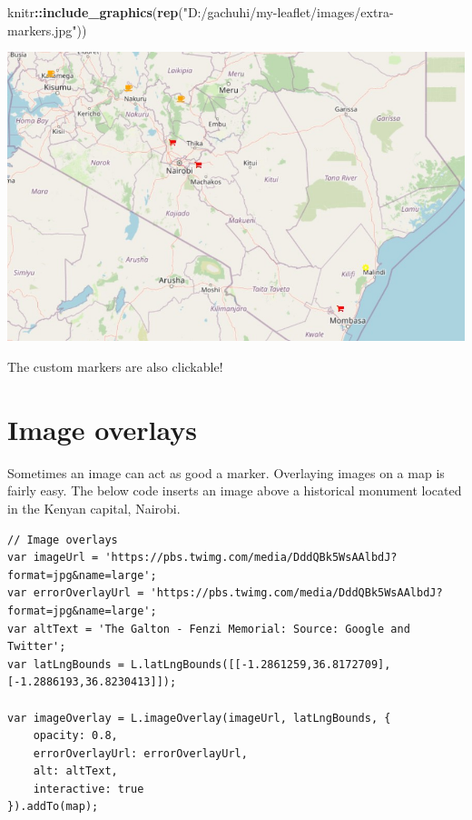 \documentclass[
]{book}
\newenvironment{Shaded}{\begin{snugshade}}{\end{snugshade}}
\newcommand{\FunctionTok}[1]{\textcolor[rgb]{0.13,0.29,0.53}{\textbf{#1}}}
\newcommand{\NormalTok}[1]{#1}
\newcommand{\SpecialCharTok}[1]{\textcolor[rgb]{0.81,0.36,0.00}{\textbf{#1}}}
\newcommand{\StringTok}[1]{\textcolor[rgb]{0.31,0.60,0.02}{#1}}
\begin{document}
\begin{Shaded}
\begin{Highlighting}[]
\NormalTok{knitr}\SpecialCharTok{::}\FunctionTok{include\_graphics}\NormalTok{(}\FunctionTok{rep}\NormalTok{(}\StringTok{"D:/gachuhi/my{-}leaflet/images/extra{-}markers.jpg"}\NormalTok{))}
\end{Highlighting}
\end{Shaded}

\includegraphics{../images/extra-markers.jpg}

The custom markers are also clickable!

\hypertarget{image-overlays}{%
\section{Image overlays}\label{image-overlays}}

Sometimes an image can act as good a marker. Overlaying images on a map is fairly easy. The below code inserts an image above a historical monument located in the Kenyan capital, Nairobi.

\begin{verbatim}
// Image overlays
var imageUrl = 'https://pbs.twimg.com/media/DddQBk5WsAAlbdJ?format=jpg&name=large';
var errorOverlayUrl = 'https://pbs.twimg.com/media/DddQBk5WsAAlbdJ?format=jpg&name=large';
var altText = 'The Galton - Fenzi Memorial: Source: Google and Twitter';
var latLngBounds = L.latLngBounds([[-1.2861259,36.8172709], [-1.2886193,36.8230413]]);

var imageOverlay = L.imageOverlay(imageUrl, latLngBounds, {
    opacity: 0.8,
    errorOverlayUrl: errorOverlayUrl,
    alt: altText,
    interactive: true
}).addTo(map);

\end{verbatim}
\end{document}
